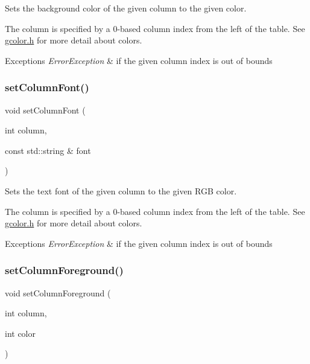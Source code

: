 Sets the background color of the given column to the given color. 

The column is specified by a 0-\/based column index from the left of the table. See \mbox{\hyperlink{gcolor_8h_source}{gcolor.\+h}} for more detail about colors. 
\begin{DoxyExceptions}{Exceptions}
{\em Error\+Exception} & if the given column index is out of bounds \\
\hline
\end{DoxyExceptions}
\mbox{\label{classsgl_1_1GTable_a0294ee7cb1af024bc77371f27d877164}} 
\subsubsection{\texorpdfstring{set\+Column\+Font()}{setColumnFont()}}
{\footnotesize\ttfamily void set\+Column\+Font (\begin{DoxyParamCaption}\item[{int}]{column,  }\item[{const std\+::string \&}]{font }\end{DoxyParamCaption})\hspace{0.3cm}{\ttfamily [virtual]}}



Sets the text font of the given column to the given R\+GB color. 

The column is specified by a 0-\/based column index from the left of the table. See \mbox{\hyperlink{gcolor_8h_source}{gcolor.\+h}} for more detail about colors. 
\begin{DoxyExceptions}{Exceptions}
{\em Error\+Exception} & if the given column index is out of bounds \\
\hline
\end{DoxyExceptions}
\mbox{\label{classsgl_1_1GTable_aa616c02b04beb6ca757dec04f46814b0}} 
\subsubsection{\texorpdfstring{set\+Column\+Foreground()}{setColumnForeground()}\hspace{0.1cm}{\footnotesize\ttfamily [1/2]}}
{\footnotesize\ttfamily void set\+Column\+Foreground (\begin{DoxyParamCaption}\item[{int}]{column,  }\item[{int}]{color }\end{DoxyParamCaption})\hspace{0.3cm}{\ttfamily [virtual]}}



